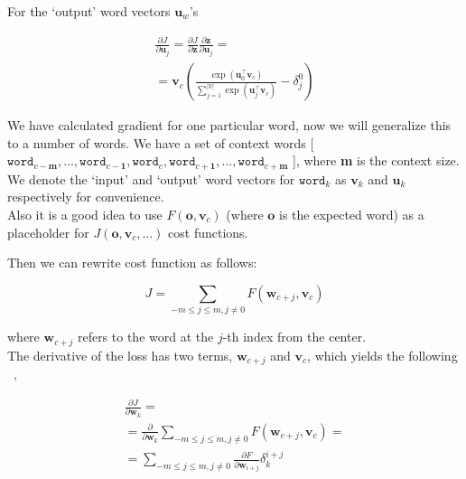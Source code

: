 \noindent For the `output' word vectors ${\boldsymbol u}_{w}$'s

\begin{equation}
	\begin{multlined}
	\frac{\partial J}{\partial{\boldsymbol u}_{j}} = \frac{\partial J}{\partial{{\boldsymbol z}}}\frac{\partial{{\boldsymbol z}}}{\partial{\boldsymbol u}_{j}} =\\
	= {\boldsymbol v}_{c}\left(\frac{\exp{({\boldsymbol u}^{\top}_{0}{\boldsymbol v}_{c})}}{\sum^{\vert{V}\vert}_{j=1}\exp{({\boldsymbol u}^{\top}_{j}{\boldsymbol v}_{c})}} - \delta^{0}_{j}\right)
	\end{multlined}
\end{equation}

\noindent We have calculated gradient for one particular word, now we will generalize this to a number of words. We have a set of context words [$\texttt{word}_{c-\textbf{m}},...,\texttt{word}_{c-\textbf{1}},\texttt{word}_{c},\texttt{word}_{c+\textbf{1}},...,\texttt{word}_{c+\textbf{m}}$ ], where \textbf{m} is the context size. We denote the `input' and `output' word vectors for $\texttt{word}_{k}$ as ${\boldsymbol v}_{k}$ and ${\boldsymbol u}_{k}$ respectively for
convenience. \\

\noindent Also it is a good idea to use $F({\boldsymbol o}, {\boldsymbol v}_{c})$ (where ${\boldsymbol o}$ is the expected word) as a placeholder for $J({\boldsymbol o}, {\boldsymbol v}_{c}, ...)$ cost functions.

\noindent Then we can rewrite cost function as follows:

\begin{equation}
J =   \sum_{-m\le j\le m, j\neq0}F({\boldsymbol w}_{c+j}, {\boldsymbol v}_{c})
\end{equation}

where ${\boldsymbol w}_{c+j}$ refers to the word at the $j$-th index from the center.\\

The derivative of the loss has two terms, ${\boldsymbol w}_{c+j}$ and ${\boldsymbol v}_{c}$, which yields the following ~\cite{assignment1},

\begin{equation}
	\begin{multlined}
	\frac{\partial{J}}{\partial{\boldsymbol w}_{k}} = \\ =\frac{\partial}{\partial{\boldsymbol w}_{k}}\sum_{-m\le j\le m, j\neq0}F({\boldsymbol w}_{c+j}, {\boldsymbol v}_{c})= \\
	= \sum_{-m\le j\le m, j\neq0} \frac{\partial{F}}{\partial{\boldsymbol w}_{i+j}}\delta^{i+j}_{k}
	\end{multlined}
\end{equation}

